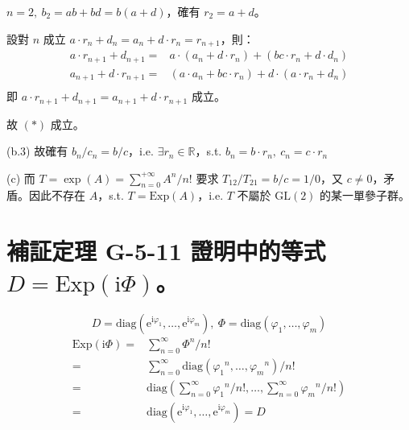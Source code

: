 \documentclass{article}
\begin{document}
\begin{framed}
  $n=2,\ b_2=ab+bd=b(a+d)$，確有 $r_2=a+d$。

  設對 $n$ 成立 $a \cdot {r_n} + {d_n} = {a_n} + d \cdot {r_n} = {r_{n + 1}}$，則：
  $$\begin{aligned}
      a \cdot {r_{n + 1}} + {d_{n + 1}} = & a \cdot \left( {{a_n} + d \cdot {r_n}} \right) + \left( {bc \cdot {r_n} + d \cdot {d_n}} \right) \\
      {a_{n + 1}} + d \cdot {r_{n + 1}} = & \left( {a \cdot {a_n} + bc \cdot {r_n}} \right) + d \cdot \left( {a \cdot {r_n} + {d_n}} \right) \\
    \end{aligned}$$
  即 $a \cdot {r_{n + 1}} + {d_{n + 1}}={a_{n + 1}} + d \cdot {r_{n + 1}}$ 成立。

  故 $(*)$ 成立。

  (b.3)
  故確有 $b_n/c_n=b/c$，i.e. $\exists r_n\in\mathbb{R}$，s.t. $b_n=b\cdot r_n,\ c_n=c\cdot r_n$

  (c)
  而 $T=\exp(A)=\sum^{+\infty}_{n=0}A^n/n!$ 要求 $T_{12}/T_{21}=b/c=1/0$，又 $c\neq 0$，矛盾。因此不存在 $A$，s.t. $T=\mathrm{Exp}(A)$，i.e. $T$ 不屬於 $\mathrm{GL}(2)$ 的某一單參子群。
\end{framed}

\section{補証定理 G-5-11 證明中的等式 $D=\mathrm{Exp}(\mathrm{i}\varPhi)$。}
\begin{framed}
  $$D=\mathrm{diag}\left(\mathrm{e}^{\mathrm{i}\varphi_1},\dots,\mathrm{e}^{\mathrm{i}\varphi_m}\right),\ \varPhi=\mathrm{diag}\left(\varphi_1,\dots,\varphi_m\right)$$
  $$\begin{aligned}
      {\text{Exp}}\left( {{\text{i}}\varPhi } \right) = & \sum\limits_{n = 0}^\infty  {{\varPhi ^n}/n!}                                                                                         \\
      =                                                 & \sum\limits_{n = 0}^\infty  {{\text{diag}}\left( {{\varphi _1}^n, \dots ,{\varphi _m}^n} \right)/n!}                                  \\
      =                                                 & {\text{diag}}\left( {\sum\limits_{n = 0}^\infty {{\varphi _1}^n/n!, \dots ,} \sum\limits_{n = 0}^\infty {{\varphi _m}^n/n!} } \right) \\
      =                                                 & {\text{diag}}\left( {{{\text{e}}^{{\text{i}}{\varphi _1}}}, \dots ,{{\text{e}}^{{\text{i}}{\varphi _m}}}} \right) = D                 \\
    \end{aligned}$$
\end{framed}
\end{document}
